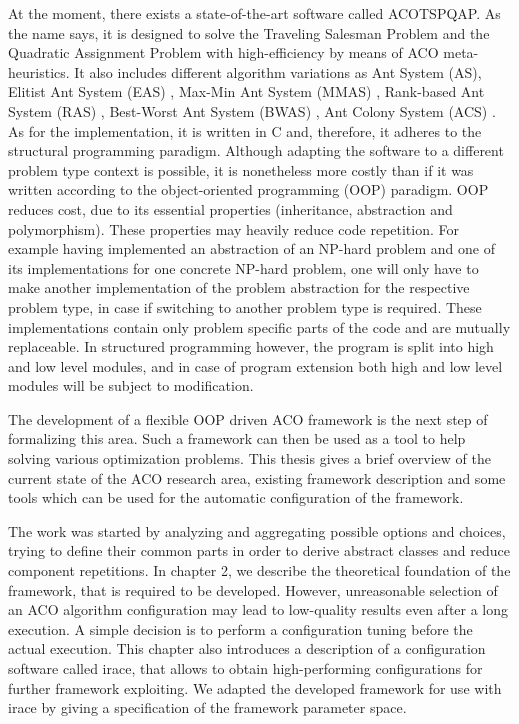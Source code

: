 \documentclass[11pt,a4paper,oneside]{book}
\begin{document}
At the moment, there exists a state-of-the-art software called ACOTSPQAP. As the name says, it is designed to solve the Traveling Salesman Problem and the Quadratic Assignment Problem with high-efficiency by means of ACO meta-heuristics. It also includes different algorithm variations as Ant System (AS), Elitist Ant System (EAS) \cite{Dor1992:thesis,Dorigo1996}, Max-Min Ant System (MMAS) \cite{STUTZLE2000889}, Rank-based Ant System (RAS) \cite{Bullnheimer97anew}, Best-Worst Ant System (BWAS) \cite{Cordon00anew}, Ant Colony System (ACS) \cite{Dorigo1997}. As for the implementation, it is written in C and, therefore, it adheres to the structural programming paradigm. Although adapting the software to a different problem type context is possible, it is nonetheless more costly than if it was written according to the object-oriented programming (OOP) paradigm. OOP reduces cost, due to its essential properties (inheritance, abstraction and polymorphism). These properties may heavily reduce code repetition. For example having implemented an abstraction of an NP-hard problem and one of its implementations for one concrete NP-hard problem, one will only have to make another implementation of the problem abstraction for the respective problem type, in case if switching to another problem type is required. These implementations contain only problem specific parts of the code and are mutually replaceable. In structured programming however, the program is split into high and low level modules, and in case of program extension both high and low level modules will be subject to modification.

The development of a flexible OOP driven ACO framework is the next step of formalizing this area. Such a framework can then be used as a tool to help solving various optimization problems. This thesis gives a brief overview of the current state of the ACO research area, existing framework description and some tools which can be used for the automatic configuration of the framework.

The work was started by analyzing and aggregating possible options and choices, trying to define their common parts in order to derive abstract classes and reduce component repetitions. In chapter 2, we describe the theoretical foundation of the framework, that is required to be developed. However, unreasonable selection of an ACO algorithm configuration may lead to low-quality results even after a long execution. A simple decision is to perform a configuration tuning before the actual execution. This chapter also introduces a description of a configuration software called irace, that allows to obtain high-performing configurations for further framework exploiting. We adapted the developed framework for use with irace by giving a specification of the framework parameter space.
\end{document}

